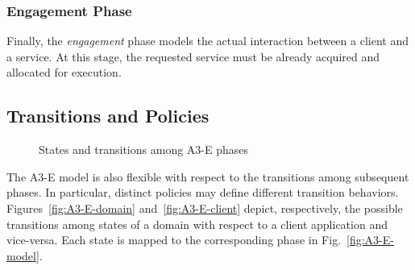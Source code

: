 \subsubsection*{Engagement Phase}\label{sec:A3-E-engagement}

Finally, the \textit{engagement} phase models the actual interaction between a client and a service. At this stage, the requested service must be already acquired and allocated for execution. 

\subsection{Transitions and Policies}

\begin{figure}[tbp]
	\raggedright
	\hfill
	
	\hfill
	\caption{States and transitions among A3-E phases} \label{fig:A3-E-states}
\end{figure}

The A3-E model is also flexible with respect to the transitions among subsequent phases. In particular, distinct policies may define different transition behaviors. Figures~\ref{fig:A3-E-domain} and~\ref{fig:A3-E-client} depict, respectively, the possible transitions among states of a domain with respect to a client application and vice-versa. Each state is mapped to the corresponding phase in Fig.~\ref{fig:A3-E-model}. 

